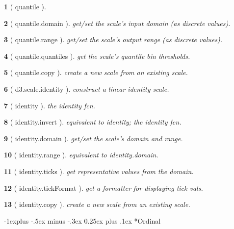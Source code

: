 \documentclass[10pt,landscape,letterpaper]{article}
\makeatletter
\newcounter{thm}
\newcommand{\hdrule}{\vspace{-4pt} \hdashrule[0.25ex]{\fill}{.5pt}{1pt}\vspace{-4pt}}
\theoremstyle{mytheoremstyle}
\newtheorem*{thm}{}
\renewcommand{\subsection}{\@startsection{subsection}{2}{0mm}%
                                {-1explus -.5ex minus -.3ex}%
                                {0.25ex plus .1ex}%
                                {\normalfont\normalsize\bfseries}}
\makeatother
\begin{document}
\begin{multicols}{3}
\begin{thm} [ quantile ]
\end{thm}\begin{thm} [ quantile.domain ]  get/set the scale's input domain (as discrete values).
\end{thm}\begin{thm} [ quantile.range ]  get/set the scale's output range (as discrete values).
\end{thm}\begin{thm} [ quantile.quantiles ]  get the scale's quantile bin thresholds.
\end{thm}\begin{thm} [ quantile.copy ]  create a new scale from an existing scale.
\end{thm}\begin{thm} [ d3.scale.identity ]  construct a linear identity scale.
\end{thm}\begin{thm} [ identity ]  the identity fcn.
\end{thm}\begin{thm} [ identity.invert ]  equivalent to identity; the identity fcn.
\end{thm}\begin{thm} [ identity.domain ]  get/set the scale's domain and range.
\end{thm}\begin{thm} [ identity.range ]  equivalent to identity.domain.
\end{thm}\begin{thm} [ identity.ticks ]  get representative values from the domain.
\end{thm}\begin{thm} [ identity.tickFormat ]  get a formatter for displaying tick vals.
\end{thm}\begin{thm} [ identity.copy ]  create a new scale from an existing scale.
\end{thm}
\hdrule
\subsection*{Ordinal}


\end{multicols}
\end{document}
